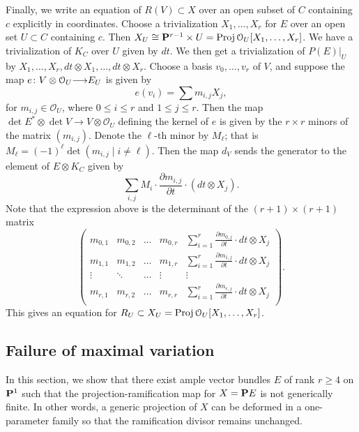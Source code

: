 \documentclass[11pt,reqno]{amsart}
\theoremstyle{plain}
\theoremstyle{definition}
\theoremstyle{remark}
\numberwithin{equation}{section}
\renewcommand{\to}{{\longrightarrow}}
\numberwithin{equation}{section}
\renewcommand{\O}{\mathcal O}
\newcommand{\Proj}{{\text{\rm Proj}\,}}
\begin{document}
Finally, we write an equation of $R(V) \subset X$ over an open subset of $C$ containing $c$ explicitly in coordinates.
Choose a trivialization $X_1, \dots, X_r$ for $E$ over an open set $U \subset C$ containing $c$.
Then $X_U \cong \P^{r-1} \times U = \Proj \O_U[X_1, \dots, X_r]$.
We have a trivialization of $K_C$ over $U$ given by $dt$.
We then get a trivialization of $P(E)|_U$ by $X_1, \dots, X_r, dt \otimes X_1, \dots, dt \otimes X_r$.
Choose a basis $v_0, \dots, v_r$ of $V$, and suppose the map $e \from V \otimes \O_U \to E_U$ is given by
\[ e(v_i) = \sum m_{i,j} X_j,\]
for $m_{i,j} \in \O_U$, where $0 \leq i \leq r$ and $1 \leq j \leq r$.
Then the map $\det E^* \otimes \det V \to V \otimes \O_U$ defining the kernel of $e$ is given by the $r \times r$ minors of the matrix $(m_{i,j})$.
Denote the $\ell$-th minor by $M_\ell$; that is $M_\ell = (-1)^{\ell}\det (m_{i,j} \mid i \neq \ell)$.
Then the map $d_V$ sends the generator to the element of $E \otimes K_C$ given by
\[ \sum_{i,j} M_i \cdot \frac{\partial m_{i,j}}{\partial t} \cdot (dt \otimes X_j).\]
Note that the expression above is the determinant of the $(r+1) \times (r+1)$ matrix
\begin{equation}\label{eqn:Rmatrix}
  \begin{pmatrix}
  m_{0,1} & m_{0,2} & \dots & m_{0,r} & \sum_{i = 1}^r \frac {\partial m_{0,j}}{\partial t} \cdot dt \otimes X_j \\
  m_{1,1} & m_{1,2} & \dots & m_{1,r} & \sum_{i = 1}^r \frac {\partial m_{1,j}}{\partial t} \cdot dt \otimes X_j \\
  \vdots & \ddots & \dots & \vdots & \vdots \\
  m_{r,1} & m_{r,2} & \dots & m_{r,r} & \sum_{i = 1}^r \frac {\partial m_{r,j}}{\partial t} \cdot dt \otimes X_j \\
\end{pmatrix}.
\end{equation}
This gives an equation for $R_U \subset X_U = \Proj \O_U[X_1, \dots, X_r]$.

\subsection{Failure of maximal variation}\label{sec:failure}
In this section, we show that there exist ample vector bundles $E$ of rank $r \geq 4$ on $\P^1$ such that the projection-ramification map for $X = \P E$ is not generically finite.
In other words, a generic projection of $X$ can be deformed in a one-parameter family so that the ramification divisor remains unchanged.
\end{document}
